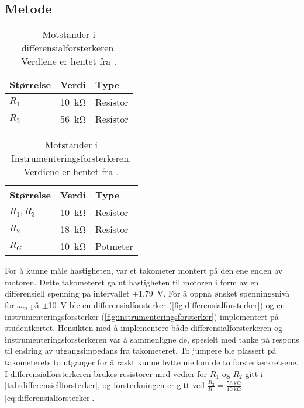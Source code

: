 \subsection{Metode}

\begin{table}[h]
	\centering
    \caption{Motstander i differensialforsterkeren. Verdiene er hentet fra \cite{AnalogMotorlabbOppgaver}.}
	\begin{tabular}{lll}
		\toprule
		Størrelse & Verdi & Type \\
		\midrule
        $R_1$ & \SI{10}{\kilo\ohm} & Resistor \\
        $R_2$ & \SI{56}{\kilo\ohm} & Resistor\\
		\bottomrule
	\end{tabular}
\label{tab:differensiellforsterker}
\end{table}

\begin{table}[h]
	\centering
    \caption{Motstander i Instrumenteringsforsterkeren. Verdiene er hentet fra \cite{AnalogMotorlabbOppgaver}.}
	\begin{tabular}{lll}
		\toprule
		Størrelse & Verdi & Type \\
		\midrule
        $R_1, R_3$ & \SI{10}{\kilo\ohm} & Resistor \\
        $R_2$ & \SI{18}{\kilo\ohm} & Resistor\\
        $R_G$ & \SI{10}{\kilo\ohm} & Potmeter\\
		\bottomrule
	\end{tabular}
    \label{tab:Instrumenteringsforsterker}
\end{table}

For å kunne måle hastigheten, var et takometer montert på den ene enden av motoren.
Dette takometeret ga ut hastigheten til motoren i form av en differensiell spenning på intervallet $\pm${\SI{1.79}{\volt}}.
For å oppnå ønsket spenningsnivå for $\omega_m$ på $\pm${\SI{10}{\volt}} ble en differensialforsterker (\autoref{fig:differensialforsterker}) og en instrumenteringsforsterker (\autoref{fig:instrumenteringsforsterker}) implementert på studentkortet.
Hensikten med å implementere både differensialforsterkeren og instrumenteringsforsterkeren var å sammenligne de, spesielt med tanke på respons til endring av utgangsimpedans fra takometeret.
To jumpere ble plassert på takometerets to utganger for å raskt kunne bytte mellom de to forsterkerkretsene. I differensialforsterkeren brukes resistorer med vedier for $R_1$ og $R_2$ gitt i \autoref{tab:differensiellforsterker}, og forsterkningen er gitt ved $\frac{R_2}{R_1} = \frac{\SI{56}{\kilo\ohm}}{\SI{10}{\kilo\ohm}}$\eqref{eq:differensialforsterker}.

